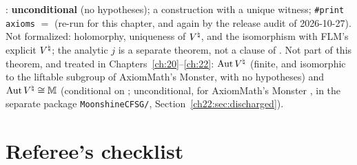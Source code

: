 \begin{status}
: \textbf{unconditional} (no hypotheses); a construction with a unique
witness; \texttt{\#print axioms} $=$
 (re-run for this chapter, and again by the release audit of
2026-10-27).  Not formalized: holomorphy, uniqueness of ${V^{\natural}}$, and the isomorphism with FLM's explicit ${V^{\natural}}$;
the analytic $j$ is a separate theorem, not a clause of .  Not part of this theorem, and treated in
Chapters~\ref{ch:20}--\ref{ch:22}: $\operatorname{Aut}{V^{\natural}}$ (finite, and isomorphic to the liftable subgroup of AxiomMath's Monster,
with no hypotheses) and $\operatorname{Aut}{V^{\natural}}\cong\mathbb M$ (conditional on ; unconditional, for AxiomMath's
Monster , in the separate package \texttt{MoonshineCFSG/}, Section~\ref{ch22:sec:discharged}).
\end{status}

\section{Referee's checklist}\label{ch14:sec:checklist}

